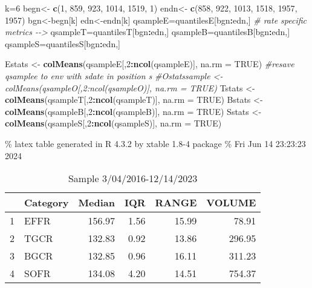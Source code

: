 \documentclass[
]{article}
\newenvironment{Shaded}{\begin{snugshade}}{\end{snugshade}}
\newcommand{\AttributeTok}[1]{\textcolor[rgb]{0.13,0.29,0.53}{#1}}
\newcommand{\CommentTok}[1]{\textcolor[rgb]{0.56,0.35,0.01}{\textit{#1}}}
\newcommand{\ConstantTok}[1]{\textcolor[rgb]{0.56,0.35,0.01}{#1}}
\newcommand{\DecValTok}[1]{\textcolor[rgb]{0.00,0.00,0.81}{#1}}
\newcommand{\FunctionTok}[1]{\textcolor[rgb]{0.13,0.29,0.53}{\textbf{#1}}}
\newcommand{\NormalTok}[1]{#1}
\newcommand{\OtherTok}[1]{\textcolor[rgb]{0.56,0.35,0.01}{#1}}
\newcommand{\SpecialCharTok}[1]{\textcolor[rgb]{0.81,0.36,0.00}{\textbf{#1}}}
\begin{document}
\begin{Shaded}
\begin{Highlighting}[]
\NormalTok{k}\OtherTok{=}\DecValTok{6}
\NormalTok{begn}\OtherTok{\textless{}{-}} \FunctionTok{c}\NormalTok{(}\DecValTok{1}\NormalTok{, }\DecValTok{859}\NormalTok{, }\DecValTok{923}\NormalTok{,  }\DecValTok{1014}\NormalTok{, }\DecValTok{1519}\NormalTok{, }\DecValTok{1}\NormalTok{)}
\NormalTok{endn}\OtherTok{\textless{}{-}} \FunctionTok{c}\NormalTok{(}\DecValTok{858}\NormalTok{, }\DecValTok{922}\NormalTok{, }\DecValTok{1013}\NormalTok{, }\DecValTok{1518}\NormalTok{, }\DecValTok{1957}\NormalTok{, }\DecValTok{1957}\NormalTok{)}
\NormalTok{bgn}\OtherTok{\textless{}{-}}\NormalTok{begn[k]}
\NormalTok{edn}\OtherTok{\textless{}{-}}\NormalTok{endn[k]}
\NormalTok{qsampleE}\OtherTok{=}\NormalTok{quantilesE[bgn}\SpecialCharTok{:}\NormalTok{edn,] }\CommentTok{\# rate specific metrics  {-}{-}\textgreater{}}
\NormalTok{qsampleT}\OtherTok{=}\NormalTok{quantilesT[bgn}\SpecialCharTok{:}\NormalTok{edn,] }
\NormalTok{qsampleB}\OtherTok{=}\NormalTok{quantilesB[bgn}\SpecialCharTok{:}\NormalTok{edn,] }
\NormalTok{qsampleS}\OtherTok{=}\NormalTok{quantilesS[bgn}\SpecialCharTok{:}\NormalTok{edn,] }

\NormalTok{Estats }\OtherTok{\textless{}{-}} \FunctionTok{colMeans}\NormalTok{(qsampleE[,}\DecValTok{2}\SpecialCharTok{:}\FunctionTok{ncol}\NormalTok{(qsampleE)], }\AttributeTok{na.rm =} \ConstantTok{TRUE}\NormalTok{)}
\CommentTok{\#resave qsamplee to env with sdate in position s}
\CommentTok{\#Ostatssample \textless{}{-} colMeans(qsampleO[,2:ncol(qsampleO)], na.rm = TRUE)}
\NormalTok{Tstats }\OtherTok{\textless{}{-}} \FunctionTok{colMeans}\NormalTok{(qsampleT[,}\DecValTok{2}\SpecialCharTok{:}\FunctionTok{ncol}\NormalTok{(qsampleT)], }\AttributeTok{na.rm =} \ConstantTok{TRUE}\NormalTok{)}
\NormalTok{Bstats }\OtherTok{\textless{}{-}} \FunctionTok{colMeans}\NormalTok{(qsampleB[,}\DecValTok{2}\SpecialCharTok{:}\FunctionTok{ncol}\NormalTok{(qsampleB)], }\AttributeTok{na.rm =} \ConstantTok{TRUE}\NormalTok{)}
\NormalTok{Sstats }\OtherTok{\textless{}{-}} \FunctionTok{colMeans}\NormalTok{(qsampleS[,}\DecValTok{2}\SpecialCharTok{:}\FunctionTok{ncol}\NormalTok{(qsampleS)], }\AttributeTok{na.rm =} \ConstantTok{TRUE}\NormalTok{)}
\end{Highlighting}
\end{Shaded}

\% latex table generated in R 4.3.2 by xtable 1.8-4 package
\% Fri Jun 14 23:23:23 2024

\begin{table}[ht]
\centering
\begin{tabular}{rlrrrr}
  \hline
 & Category & Median & IQR & RANGE & VOLUME \\ 
  \hline
1 & EFFR & 156.97 & 1.56 & 15.99 & 78.91 \\ 
  2 & TGCR & 132.83 & 0.92 & 13.86 & 296.95 \\ 
  3 & BGCR & 132.85 & 0.96 & 16.11 & 311.23 \\ 
  4 & SOFR & 134.08 & 4.20 & 14.51 & 754.37 \\ 
   \hline
\end{tabular}
\caption{Sample 3/04/2016-12/14/2023} 
\end{table}
\end{document}
